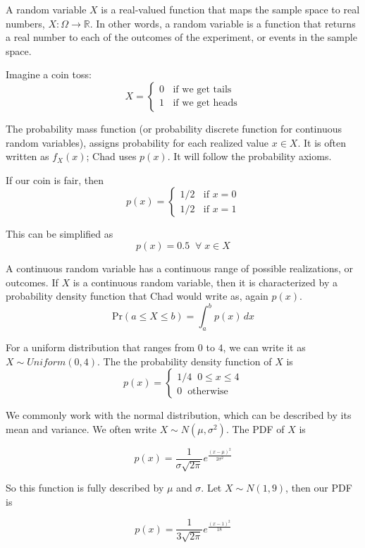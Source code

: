 \documentclass{article} %
\newcommand*\red{\color{red}}  %
\begin{document}
A {\red random variable} $X$ is a real-valued function that maps the sample space to real numbers, $X : \Omega \rightarrow \mathbb{R}$. In other words, a random variable is a function that returns a real number to each of the outcomes of the experiment, or events in the sample space.

Imagine a coin toss:
\[
X = \begin{cases}
	0 \;\; \text{ if we get tails} \\
	1 \;\; \text{ if we get heads}
\end{cases}
\]

The {\red probability mass function} (or probability discrete function for continuous random variables), assigns probability for each realized value $x \in X$. It is often written as $f_X(x)$; Chad uses $p(x)$. It will follow the probability axioms.

If our coin is fair, then
\[
p(x) = \begin{cases}
1/2 \;\; \text{ if } x = 0 \\
1/2 \;\; \text{ if } x = 1
\end{cases}
\]

This can be simplified as 
\[
p(x) = 0.5 \;\; \forall \; x \in X
\]

A {\red continuous random variable} has a continuous range of possible realizations, or outcomes. If $X$ is a continuous random variable, then it is characterized by a {\red probability density function} that Chad would write as, again $p(x)$.
\[
\text{Pr}(a \leq X \leq b) =  \int_a^b p(x) \, dx
\] 

For a uniform distribution that ranges from $0$ to $4$, we can write it as $X \sim Uniform(0, 4)$. The the probability density function of $X$ is
\[
p(x) = \begin{cases}
1/4 \;\; 0 \leq x \leq 4 \\
0 \;\; \text{otherwise}
\end{cases}
\] 

We commonly work with the normal distribution, which can be described by its mean and variance. We often write $X \sim N(\mu, \sigma^2)$. The PDF of $X$ is

\[
p(x) = \frac{1}{\sigma \sqrt{2\pi}} e^{\frac{(x - \mu)^2}{2\sigma^2}}
\]

So this function is fully described by $\mu$ and $\sigma$. Let $X \sim N(1, 9)$, then our PDF is

\[
p(x) = \frac{1}{3\sqrt{2\pi}} e^{\frac{(x - 1)^2}{18}}
\]
\end{document}
